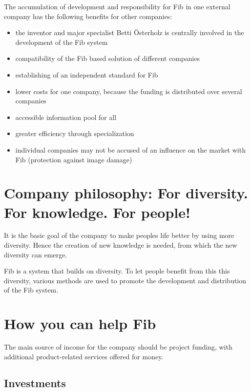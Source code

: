 \documentclass[12pt,a4paper]{article}
\begin{document}
The accumulation of development and responsibility for Fib in one external company has the following benefits for other companies:
\begin{itemize}
 \item the inventor and major specialist Betti \"{O}sterholz is centrally involved in the development of the Fib system
 \item compatibility of the Fib based solution of different companies
 \item establishing of an independent standard for Fib
 \item lower costs for one company, because the funding is distributed over several companies
 \item accessible information pool for all
 \item greater efficiency through specialization
 \item individual companies may not be accused of an influence on the market with Fib (protection against image damage)
\end{itemize}


\section{Company philosophy: \newline For diversity. For knowledge. For people!}

It is the basic goal of the company to make peoples life better by using more diversity. Hence the creation of new knowledge is needed, from which the new diversity can emerge.

Fib is a system that builds on diversity. To let people benefit from this this diversity, various methods are used to promote the development and distribution of the Fib system.


\newpage
\section{How you can help Fib}

The main source of income for the company should be project funding, with additional product-related services offered for money.


\subsection{Investments}
\end{document}
